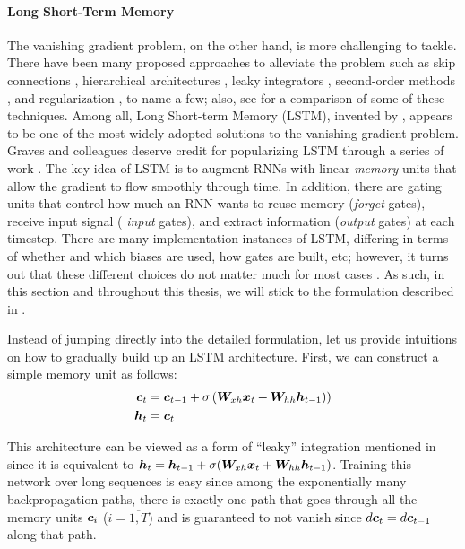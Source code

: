 \paragraph{Long Short-Term Memory}
The vanishing gradient problem, on the other hand, is more challenging to
tackle. There have been many proposed approaches to alleviate the problem such
as skip connections \cite{waibel90,lin96}, hierarchical
architectures \cite{el96}, leaky integrators \cite{Jaeger2007}, second-order
methods \cite{MartensS11}, and
regularization \cite{pascanu13}, to name a few; also, see \cite{bengio13} for a
comparison of some of these techniques. Among all, Long Short-term
Memory (LSTM), invented by  , appears to be one of the most
widely adopted solutions to the vanishing gradient problem.
Graves and colleagues deserve credit for popularizing LSTM through a series of
work \cite{graves05,graves09,graves13c}. 
The key idea of LSTM
is to augment RNNs with linear {\it memory} units that allow the gradient to
flow smoothly through time. In addition, there are gating units that control how
much an RNN wants to reuse memory ({\it forget} gates), receive input signal ({\it
input} gates), and extract information ({\it output} gates) at each timestep.
There are many implementation instances of LSTM, differing in terms of
whether and which biases are used, how gates are built, etc; however, it turns
out that these different choices do not matter much for most cases
\cite{jozefowicz15,greff15}. As such, in this section and throughout this
thesis, we will stick to the formulation described in \cite{zaremba14}.

Instead of jumping directly into the detailed formulation, let us provide intuitions
on how to gradually build up an LSTM architecture. First, we can construct a
simple memory unit as follows:
\begin{align}
\bm{c}_{t} &= \bm{c}_{t-1} + \sigma\left(\bm{W}_{xh}\bm{x}_{t} + \bm{W}_{hh}\bm{h}_{t-1}\right)
\label{e:simple_mem}) \\
\bm{h}_{t} &= \bm{c}_{t}
\end{align}

This architecture can be viewed as a form of ``leaky'' integration 
mentioned in \cite{sutskever12,bengio13} since it is equivalent to $\bm{h}_{t} =
\bm{h}_{t-1} + \sigma(\bm{W}_{xh}\bm{x}_{t} + \bm{W}_{hh}\bm{h}_{t-1})$. Training this
network over long sequences is easy since among the exponentially many backpropagation
paths, there is exactly one path that goes through all the memory units
$\bm{c}_{i}$ ($i=\overline{1,T}$) and is
guaranteed to not vanish since $d\bm{c}_{t} = d\bm{c}_{t-1}$ along that path. 

